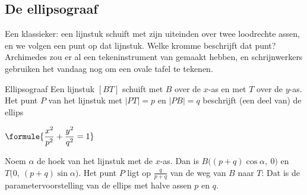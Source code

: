 \begin{oefeningen}
\end{oefeningen}

\subsection{De ellipsograaf}

Een klassieker: een lijnstuk schuift met zijn uiteinden over twee loodrechte assen, en we volgen een punt op dat lijnstuk. Welke kromme beschrijft dat punt? Archimedes zou er al een tekeninstrument van gemaakt hebben, en schrijnwerkers gebruiken het vandaag nog om een ovale tafel te tekenen.

\begin{theorie}
\begin{minipage}[t]{.62\linewidth}
\vspace{0pt}
\begin{stelling}{Ellipsograaf}
Een lijnstuk $[BT]$ schuift met $B$ over de $x$-as en met $T$ over de $y$-as. Het punt $P$ van het lijnstuk met $|PT| = p$ en $|PB| = q$ beschrijft (een deel van) de ellips

\vspace{1mm}
\qquad $\formule{\dfrac{x^2}{p^2} + \dfrac{y^2}{q^2} = 1}$
\end{stelling}

\begin{bewijs}
Noem $\alpha$ de hoek van het lijnstuk met de $x$-as. Dan is $B\bigl((p + q)\cos\alpha,\ 0\bigr)$ en $T\bigl(0,\ (p + q)\sin\alpha\bigr)$. Het punt $P$ ligt op $\tfrac{q}{p + q}$ van de weg van $B$ naar $T$:
Dat is de parametervoorstelling van de ellips met halve assen $p$ en $q$.
\end{bewijs}
\end{minipage}\hfill
\begin{minipage}[t]{.34\linewidth}
\vspace{6mm}
\centering
{}
\end{minipage}
\end{theorie}


